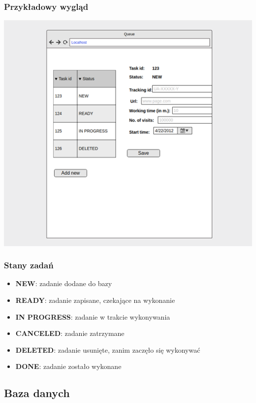 \documentclass{article}
\begin{document}
\subsubsection{Przykładowy wygląd}
\begin{center}\includegraphics[scale=0.75]{ui}\end{center}

\subsubsection{Stany zadań}

\begin{itemize}
\item \textbf{NEW}: zadanie dodane do bazy
\item \textbf{READY}: zadanie zapisane, czekające na wykonanie
\item \textbf{IN PROGRESS}: zadanie w trakcie wykonywania
\item \textbf{CANCELED}: zadanie zatrzymane
\item \textbf{DELETED}: zadanie usunięte, zanim zaczęło się wykonywać
\item \textbf{DONE}: zadanie zostało wykonane
\end{itemize}

\subsection{Baza danych}
\end{document}
